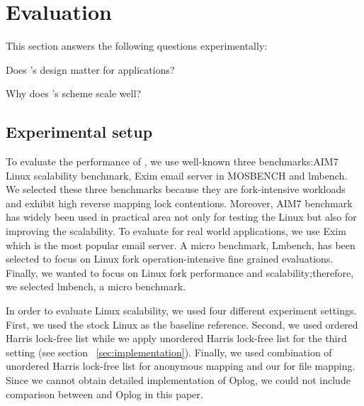 \section{Evaluation}


This section answers the following questions experimentally:
\begin{CompactItemize}
\item Does \ldu's design matter for applications?

\item Why does \ldu's scheme scale well?
\end{CompactItemize}


\subsection{Experimental setup}



To evaluate the performance of , we use well-known
three benchmarks:AIM7 Linux scalability benchmark, Exim email server in
MOSBENCH and lmbench.
We selected these three benchmarks because they are fork-intensive workloads and
exhibit high reverse mapping lock contentions.
Moreover, AIM7 benchmark has widely been used in practical area not only for testing the
Linux but also for improving the scalability. 
To evaluate  for real world
applications, we use Exim which is the most popular email server.
A micro benchmark, Lmbench, has been selected to focus on Linux fork operation-intensive
fine grained evaluations.
Finally, we wanted to focus on Linux fork performance and scalability;therefore,
we selected lmbench, a micro benchmark.


In order to evaluate Linux scalability, we used four different experiment
settings.
First, we used the stock Linux as the baseline reference. 
Second, we used ordered Harris lock-free list while 
we apply unordered Harris lock-free list for the third setting
(see section ~\ref{sec:implementation}). 
Finally, we used combination of unordered Harris lock-free list for anonymous mapping and
our  for file mapping.
Since we cannot obtain detailed implementation of Oplog, 
we could not include comparison between  and Oplog in this paper.

